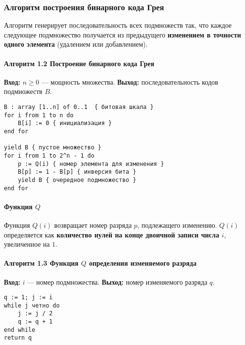 \subsubsection*{Алгоритм построения бинарного кода Грея}

Алгоритм генерирует последовательность всех подмножеств так, что каждое следующее подмножество получается из предыдущего \textbf{изменением в точности одного элемента} (удалением или добавлением).

\paragraph{Алгоритм 1.2 Построение бинарного кода Грея}
\textbf{Вход:} $n \ge 0$ --- мощность множества.  
\textbf{Выход:} последовательность кодов подмножеств $B$.
\begin{verbatim}
B : array [1..n] of 0..1  { битовая шкала }
for i from 1 to n do
    B[i] := 0 { инициализация }
end for

yield B { пустое множество }
for i from 1 to 2^n - 1 do
    p := Q(i) { номер элемента для изменения }
    B[p] := 1 - B[p] { инверсия бита }
    yield B { очередное подмножество }
end for
\end{verbatim}

\paragraph{Функция $Q$}
Функция $Q(i)$ возвращает номер разряда $p$, подлежащего изменению. $Q(i)$ определяется как \textbf{количество нулей на конце двоичной записи числа $i$}, увеличенное на $1$.

\paragraph{Алгоритм 1.3 Функция $Q$ определения изменяемого разряда}
\textbf{Вход:} $i$ --- номер подмножества.
\textbf{Выход:} номер изменяемого разряда $q$.
\begin{verbatim}
q := 1; j := i
while j четно do
    j := j / 2
    q := q + 1
end while
return q
\end{verbatim}
